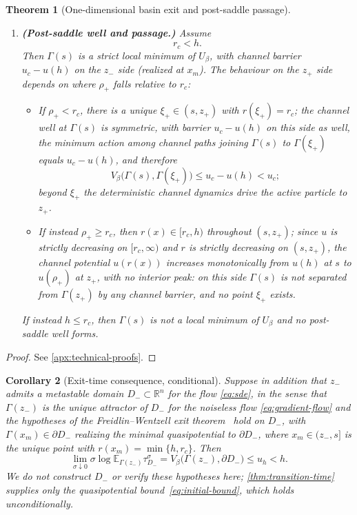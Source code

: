 \documentclass{article}
\theoremstyle{plain}
\newtheorem{theorem}{Theorem}[section]
\newtheorem{corollary}[theorem]{Corollary}
\theoremstyle{definition}
\theoremstyle{remark}
\newcommand{\R}{\mathbb{R}}
\newcommand{\E}{\mathbb{E}}
\begin{document}
\begin{theorem}[One-dimensional basin exit and post-saddle passage]
\begin{enumerate}
    \item \textbf{(Post-saddle well and passage.)}
    Assume
    \begin{equation}
        r_c<h .
        \label{eq:high-barrier-regime}
    \end{equation}
    Then \(\Gamma(s)\) is a strict local minimum of \(U_\beta\), with channel barrier \(u_c-u(h)\) on the \(z_-\) side (realized at \(x_m\)). The behaviour on the \(z_+\) side depends on where \(\rho_+\) falls relative to \(r_c\):
    \begin{itemize}
        \item If \(\rho_+<r_c\), there is a unique \(\xi_+\in(s,z_+)\) with \(r(\xi_+)=r_c\); the channel well at \(\Gamma(s)\) is symmetric, with barrier \(u_c-u(h)\) on this side as well, the minimum action among channel paths joining \(\Gamma(s)\) to \(\Gamma(\xi_+)\) equals \(u_c-u(h)\), and therefore
        \begin{equation}
            V_\beta\bigl(\Gamma(s),\Gamma(\xi_+)\bigr)\le u_c-u(h)<u_c ;
            \label{eq:post-saddle-bound}
        \end{equation}
        beyond \(\xi_+\) the deterministic channel dynamics drive the active particle to \(z_+\).
        \item If instead \(\rho_+\ge r_c\), then \(r(x)\in[r_c,h)\) throughout \((s,z_+)\); since \(u\) is strictly decreasing on \([r_c,\infty)\) and \(r\) is strictly decreasing on \((s,z_+)\), the channel potential \(u(r(x))\) increases monotonically from \(u(h)\) at \(s\) to \(u(\rho_+)\) at \(z_+\), with no interior peak: on this side \(\Gamma(s)\) is not separated from \(\Gamma(z_+)\) by any channel barrier, and no point \(\xi_+\) exists.
    \end{itemize}
    If instead \(h\le r_c\), then \(\Gamma(s)\) is not a local minimum of \(U_\beta\) and no post-saddle well forms.
\end{enumerate}
\end{theorem}
 
\begin{proof}
See \ref{apx:technical-proofs}.
\end{proof}
 
\begin{corollary}[Exit-time consequence, conditional]
\label{cor:exit-time-conditional}
Suppose in addition that \(z_-\) admits a metastable domain \(D_-\subset\R^n\) for the flow \eqref{eq:sde}, in the sense that \(\Gamma(z_-)\) is the unique attractor of \(D_-\) for the noiseless flow \eqref{eq:gradient-flow} and the hypotheses of the Freidlin--Wentzell exit theorem~\cite{freidlin2012random} hold on \(D_-\), with \(\Gamma(x_m)\in\partial D_-\) realizing the minimal quasipotential to \(\partial D_-\), where \(x_m\in(z_-,s]\) is the unique point with \(r(x_m)=\min\{h,r_c\}\). Then
\[
    \lim_{\sigma\downarrow0}\sigma\log\E_{\Gamma(z_-)}\tau_{D_-}^\sigma
    =V_\beta\bigl(\Gamma(z_-),\partial D_-\bigr)\le u_h<h .
\]
We do not construct \(D_-\) or verify these hypotheses here; \ref{thm:transition-time} supplies only the quasipotential bound~\eqref{eq:initial-bound}, which holds unconditionally.
\end{corollary}
\end{document}
